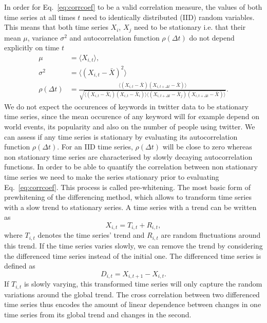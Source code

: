 \documentclass[12pt, a4paper]{article}
\begin{document}
In order for Eq.~\ref{eq:corrcoef} to be a valid correlation measure, the values of both time series at all times $t$ need to identically distributed (IID) random variables. This means that both time series $X_{i}$, $X_{j}$ need to be stationary i.e. that their mean $\mu$, variance $\sigma^{2}$ and autocorrelation function $\rho(\Delta t)$ do not depend explicitly on time $t$
\begin{align}
\mu &= \langle X_{i, t} \rangle, \\
\sigma^{2} &=  \langle (X_{i, t}-\bar{X})^{2} \rangle \\
\rho(\Delta t) &= \frac{\langle (X_{i, t}-\bar{X}) (X_{i, t+\Delta t}-\bar{X}) \rangle}{\sqrt{\langle (X_{i, t}-\bar{X}_{i}) (X_{i, t}-\bar{X}_{i}) \rangle \langle (X_{i, t+\Delta t}-\bar{X}_{j}) (X_{i, t+\Delta t}-\bar{X}_{}) \rangle}}. 
\end{align} 
We do not expect the occurences of keywords in twitter data to be stationary time series, since the mean occurence of any keyword will for example depend on world events, its popularity and also on the number of people using twitter. We can assess if any time series is stationary by evaluating its autocorrelation function $\rho(\Delta t)$. For an IID time series, $\rho(\Delta t)$ will be close to zero whereas non stationary time series are characterised by slowly decaying autocorrelation functions.
In order to be able to quantify the correlation between non stationary time series we need to make the series stationary prior to evaluating Eq.~\ref{eq:corrcoef}. This process is called pre-whitening. The most basic form of prewhitening of the differencing method, which allows to transform time series with a slow trend to stationary series. A time series with a trend can be written as \cite{dettling14}
\begin{equation}
X_{i, t} = T_{i, t} + R_{i, t},
\end{equation} 
where $T_{i, t}$ denotes the time series' trend and $R_{i, t}$ are random fluctuations around this trend. If the time series varies slowly, we can remove the trend by considering the differenced time series instead of the initial one. The differenced time series is defined as \cite{dettling14}
\begin{equation}
D_{i, t} = X_{i, t+1}- X_{i, t}.
\end{equation} 
If $T_{i, t}$ is slowly varying, this transformed time series will only capture the random variations around the global trend. The cross correlation between two differenced time series thus encodes the amount of linear dependence between changes in one time series from its global trend and changes in the second.
\end{document}
